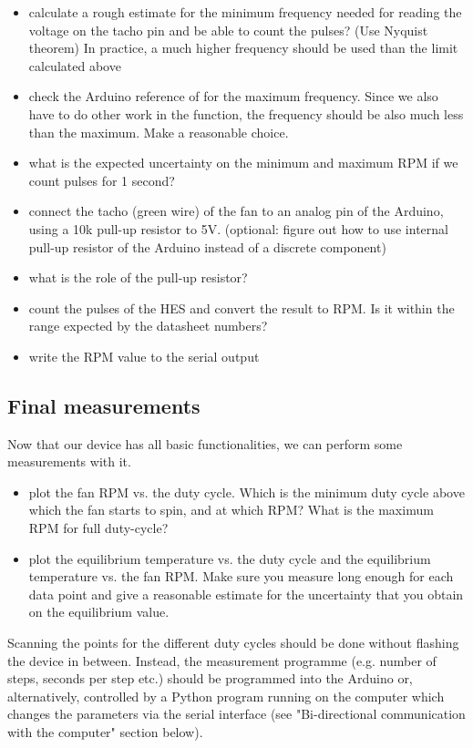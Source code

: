 \begin{itemize}
	\item calculate a rough estimate for the minimum frequency needed for reading the voltage on the tacho pin and be able to count the pulses? (Use Nyquist theorem) In practice, a much higher frequency should be used than the limit calculated above
	\item check the Arduino reference of  for the maximum frequency. Since we also have to do other work in the  function, the frequency should be also much less than the maximum. Make a reasonable choice.
    \item what is the expected uncertainty on the minimum and maximum RPM if we count pulses for 1 second?
	\item connect the tacho (green wire) of the fan to an analog pin of the Arduino, using a 10k pull-up resistor to 5V. (optional: figure out how to use internal pull-up resistor of the Arduino instead of a discrete component)
	\item what is the role of the pull-up resistor?
	\item count the pulses of the HES and convert the result to RPM. Is it within the range expected by the datasheet numbers?
	\item write the \ac{RPM} value to the serial output
\end{itemize}

\subsection{Final measurements}
Now that our device has all basic functionalities, we can perform some measurements with it.
\begin{itemize}
	\item plot the fan RPM vs. the duty cycle. Which is the minimum duty cycle above which the fan starts to spin, and at which RPM? What is the maximum RPM for full duty-cycle?
	\item plot the equilibrium temperature vs. the duty cycle and the equilibrium temperature vs. the fan RPM. Make sure you measure long enough for each data point and give a reasonable estimate for the uncertainty that you obtain on the equilibrium value.
\end{itemize}

Scanning the points for the different duty cycles should be done without flashing the device in between. Instead, the measurement programme (e.g. number of steps, seconds per step etc.) should be programmed into the Arduino or, alternatively, controlled by a Python program running on the computer which changes the parameters via the serial interface (see "Bi-directional communication with the computer" section below).


